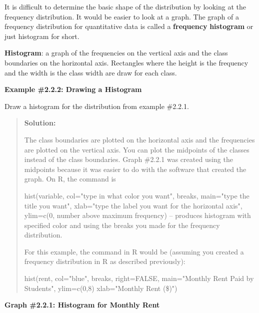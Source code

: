 \documentclass[]{book}
\begin{document}
It is difficult to determine the basic shape of the distribution by
looking at the frequency distribution. It would be easier to look at a
graph. The graph of a frequency distribution for quantitative data is
called a \textbf{frequency} \textbf{histogram} or just histogram for short.

\textbf{Histogram}: a graph of the frequencies on the vertical axis and the
class boundaries on the horizontal axis. Rectangles where the height is
the frequency and the width is the class width are draw for each class.

\textbf{Example \#2.2.2: Drawing a Histogram }

Draw a histogram for the distribution from example \#2.2.1.

\begin{quote}
\textbf{Solution:}

The class boundaries are plotted on the horizontal axis and the
frequencies are plotted on the vertical axis. You can plot the
midpoints of the classes instead of the class boundaries. Graph
\#2.2.1 was created using the midpoints because it was easier to do
with the software that created the graph. On R, the command is

hist(variable, col="type in what color you want", breaks,
main="type the title you want", xlab="type the label you want for
the horizontal axis", ylim=c(0, number above maximum frequency) --
produces histogram with specified color and using the breaks you made
for the frequency distribution.

For this example, the command in R would be (assuming you created a
frequency distribution in R as described previously):

hist(rent, col="blue", breaks, right=FALSE, main="Monthly Rent Paid
by Students", ylim=c(0,8) xlab="Monthly Rent (\$)")
\end{quote}

\textbf{Graph \#2.2.1: Histogram for Monthly Rent}
\end{document}
